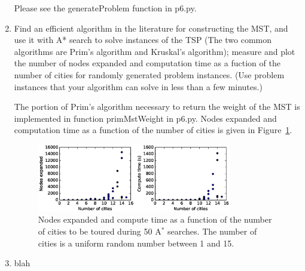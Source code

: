 \documentclass[12pt]{article}
\newenvironment{problem}[2][Problem]{\begin{trivlist}
\item[\hskip \labelsep {\bfseries #1}\hskip \labelsep {\bfseries #2.}]}{\end{trivlist}}
\begin{document}
\begin{problem}{6}
\begin{enumerate}
			Please see the generateProblem function in p6.py.
		\item
			Find an efficient algorithm in the literature for constructing the MST, and use it with A* search to solve instances of the TSP (The two common algorithms are Prim's algorithm and Kruskal's algorithm); measure and plot the number of nodes expanded and computation time as a fuction of the number of cities for randomly generated problem instances.
			(Use problem instances that your algorithm can solve in less than a few minutes.)

			The portion of Prim's algorithm necessary to return the weight of the MST is implemented in function primMstWeight in p6.py.
			Nodes expanded and computation time as a function of the number of cities is given in Figure~\ref{fig:p6graph}.
			\begin{figure}[h]
				\centering
				\includegraphics[width=0.8\textwidth]{fig/p6_h_0_cities_15_rand_True_iter_50_seed_0.eps}
				\caption{Nodes expanded and compute time as a function of the number of cities to be toured during 50 A$^*$ searches. The number of cities is a uniform random number between 1 and 15.}
				\label{fig:p6graph}
			\end{figure}
		\item[6.] blah
	\end{enumerate}
\end{problem}
\end{document}
